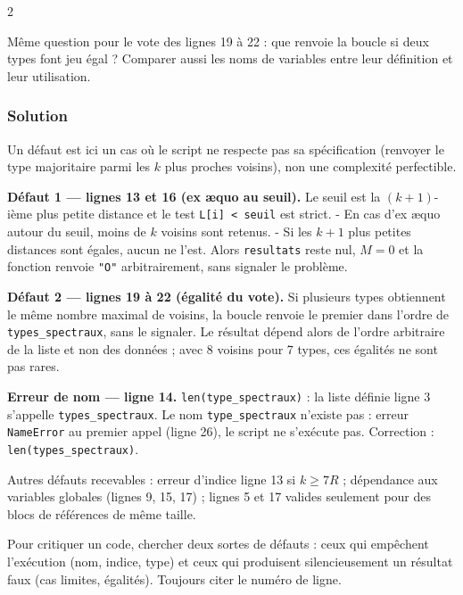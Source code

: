 \documentclass[11pt,a4paper]{article}
\begin{document}
\begin{indication}{2}

Même question pour le vote des lignes 19 à 22 : que renvoie la boucle si deux types font jeu égal ? Comparer aussi les noms de variables entre leur définition et leur utilisation.

\end{indication}

\hypertarget{solution-19}{%
\subsubsection{Solution}\label{solution-19}}

Un défaut est ici un cas où le script ne respecte pas sa spécification (renvoyer le type majoritaire parmi les \(k\) plus proches voisins), non une complexité perfectible.

\textbf{Défaut 1 --- lignes 13 et 16 (ex æquo au seuil).} Le seuil est la \((k+1)\)-ième plus petite distance et le test \texttt{L{[}i{]}\ \textless{}\ seuil} est strict.
- En cas d'ex æquo autour du seuil, moins de \(k\) voisins sont retenus.
- Si les \(k+1\) plus petites distances sont égales, aucun ne l'est. Alors \texttt{resultats} reste nul, \(M = 0\) et la fonction renvoie \texttt{"O"} arbitrairement, sans signaler le problème.

\textbf{Défaut 2 --- lignes 19 à 22 (égalité du vote).} Si plusieurs types obtiennent le même nombre maximal de voisins, la boucle renvoie le premier dans l'ordre de \texttt{types\_spectraux}, sans le signaler. Le résultat dépend alors de l'ordre arbitraire de la liste et non des données ; avec 8 voisins pour 7 types, ces égalités ne sont pas rares.

\textbf{Erreur de nom --- ligne 14.} \texttt{len(\allowbreak{}type\_spectraux)\allowbreak{}} : la liste définie ligne 3 s'appelle \texttt{types\_spectraux}. Le nom \texttt{type\_spectraux} n'existe pas : erreur \texttt{NameError} au premier appel (ligne 26), le script ne s'exécute pas. Correction : \texttt{len(\allowbreak{}types\_spectraux)\allowbreak{}}.

Autres défauts recevables : erreur d'indice ligne 13 si \(k \geqslant 7R\) ; dépendance aux variables globales (lignes 9, 15, 17) ; lignes 5 et 17 valides seulement pour des blocs de références de même taille.

\begin{methode}

Pour critiquer un code, chercher deux sortes de défauts : ceux qui empêchent l'exécution (nom, indice, type) et ceux qui produisent silencieusement un résultat faux (cas limites, égalités). Toujours citer le numéro de ligne.

\end{methode}
\end{document}
